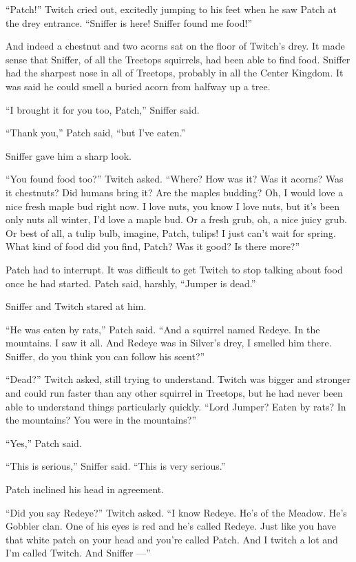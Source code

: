 \documentclass[ebook,oneside,openany,12pt]{memoir}
\begin{document}
“Patch!” Twitch cried out, excitedly jumping to his feet when he saw
Patch at the drey entrance. “Sniffer is here! Sniffer found me food!”

And indeed a chestnut and two acorns sat on the floor of Twitch’s
drey. It made sense that Sniffer, of all the Treetops squirrels, had
been able to find food. Sniffer had the sharpest nose in all of
Treetops, probably in all the Center Kingdom. It was said he could
smell a buried acorn from halfway up a tree.

“I brought it for you too, Patch,” Sniffer said.

“Thank you,” Patch said, “but I’ve eaten.”

Sniffer gave him a sharp look.

“You found food too?” Twitch asked. “Where? How was it? Was it acorns?
Was it chestnuts? Did humans bring it? Are the maples budding?  Oh, I
would love a nice fresh maple bud right now. I love nuts, you know I
love nuts, but it’s been only nuts all winter, I’d love a maple
bud. Or a fresh grub, oh, a nice juicy grub. Or best of all, a tulip
bulb, imagine, Patch, tulips! I just can’t wait for spring. What kind
of food did you find, Patch? Was it good? Is there more?”

Patch had to interrupt. It was difficult to get Twitch to stop talking
about food once he had started. Patch said, harshly, “Jumper is dead.”

Sniffer and Twitch stared at him.

“He was eaten by rats,” Patch said. “And a squirrel named Redeye. In
the mountains. I saw it all. And Redeye was in Silver’s drey, I
smelled him there. Sniffer, do you think you can follow his scent?”

“Dead?” Twitch asked, still trying to understand. Twitch was bigger
and stronger and could run faster than any other squirrel in Treetops,
but he had never been able to understand things particularly
quickly. “Lord Jumper? Eaten by rats? In the mountains? You were in
the mountains?”

“Yes,” Patch said.

“This is serious,” Sniffer said. “This is very serious.”

Patch inclined his head in agreement.

“Did you say Redeye?” Twitch asked. “I know Redeye. He’s of the
Meadow. He’s Gobbler clan. One of his eyes is red and he’s called
Redeye. Just like you have that white patch on your head and you’re
called Patch. And I twitch a lot and I’m called Twitch. And Sniffer —”
\end{document}
